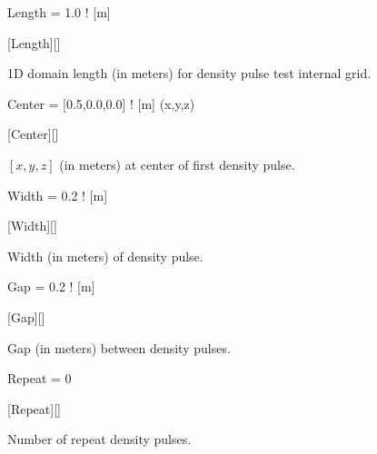 \begin{nmldescitem}
Length = 1.0  ! [m]
\end{nmldescitem}
[Length][]

\begin{nmldescbody}
1D domain length (in meters) for density pulse test internal grid.
\end{nmldescbody}


\begin{nmldescitem}
Center = [0.5,0.0,0.0]  ! [m] (x,y,z)
\end{nmldescitem}
[Center][]

\begin{nmldescbody}
$[x,y,z]$ (in meters) at center of first density pulse.
\end{nmldescbody}


\begin{nmldescitem}
Width = 0.2  ! [m]
\end{nmldescitem}
[Width][]

\begin{nmldescbody}
Width (in meters) of density pulse.
\end{nmldescbody}


\begin{nmldescitem}
Gap = 0.2  ! [m]
\end{nmldescitem}
[Gap][]

\begin{nmldescbody}
Gap (in meters) between density pulses.
\end{nmldescbody}


\begin{nmldescitem}
Repeat = 0
\end{nmldescitem}
[Repeat][]

\begin{nmldescbody}
Number of repeat density pulses.
\end{nmldescbody}


